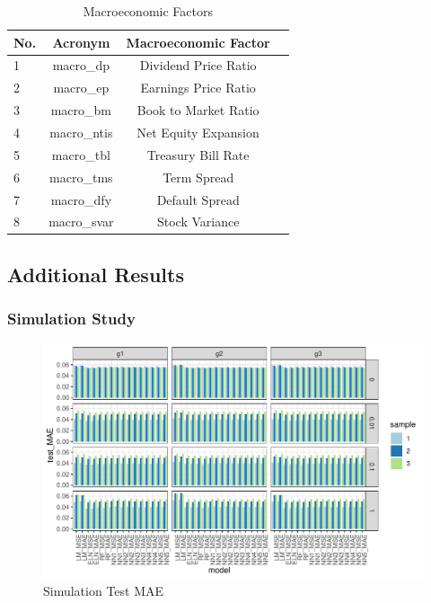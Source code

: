 \documentclass[11pt, a4paper, table]{article}
\begin{document}
\newpage


\begin{table}
	\caption{Macroeconomic Factors}
	\begin{center}
	\begin{tabular}{lccc} \hline
		No. & Acronym & Macroeconomic Factor \\ \hline
		1 & macro\_dp & Dividend Price Ratio \\
		2 & macro\_ep & Earnings Price Ratio \\
		3 & macro\_bm & Book to Market Ratio \\
		4 & macro\_ntis & Net Equity Expansion \\
		5 & macro\_tbl & Treasury Bill Rate \\
		6 & macro\_tms & Term Spread \\
		7 & macro\_dfy & Default Spread \\
		8 & macro\_svar & Stock Variance \\ \hline
	\end{tabular}
	\end{center}
\end{table}

\newpage

\subsection{Additional Results}

\subsubsection{Simulation Study}

\begin{figure}
	\includegraphics{simulation_test_mae.pdf}
	\caption{Simulation Test MAE}
\end{figure}
\end{document}
